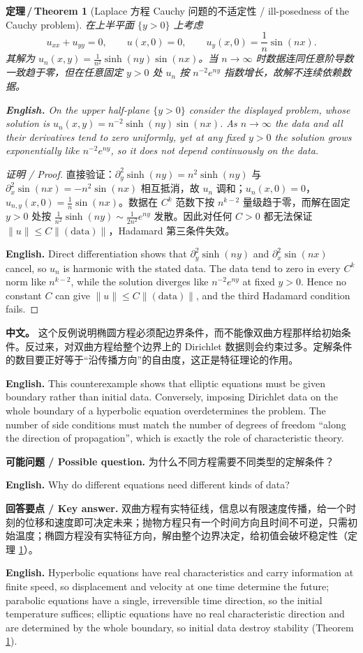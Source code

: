 \documentclass[UTF8,11pt,a4paper]{ctexart}
\newcommand{\APS}[2]{\par\noindent\textbf{中文。} #1\par\noindent\textbf{English.} #2\par\smallskip}
\newcommand{\EN}[1]{\par\noindent \textbf{English.} #1\par}
\newcommand{\ASK}[4]{\par\noindent \textbf{可能问题 / Possible question.} #1\par\EN{#2}\noindent \textbf{回答要点 / Key answer.} #3\par\EN{#4}\medskip}
\newtheorem{theorem}[definition]{定理\,/\,Theorem}
\begin{document}
\begin{theorem}[Laplace 方程 Cauchy 问题的不适定性 / ill-posedness of the Cauchy problem]\label{thm:illposed}
在上半平面 $\{y>0\}$ 上考虑
\[
u_{xx}+u_{yy}=0,\qquad u(x,0)=0,\qquad u_y(x,0)=\frac1n\sin(nx).
\]
其解为 $u_n(x,y)=\frac{1}{n^2}\sinh(ny)\sin(nx)$。当 $n\to\infty$ 时数据连同任意阶导数一致趋于零，但在任意固定 $y>0$ 处 $u_n$ 按 $n^{-2}e^{ny}$ 指数增长，故解不连续依赖数据。
\EN{On the upper half-plane $\{y>0\}$ consider the displayed problem, whose solution is $u_n(x,y)=n^{-2}\sinh(ny)\sin(nx)$. As $n\to\infty$ the data and all their derivatives tend to zero uniformly, yet at any fixed $y>0$ the solution grows exponentially like $n^{-2}e^{ny}$, so it does not depend continuously on the data.}
\end{theorem}

\begin{proof}[证明 / Proof]
直接验证：$\partial_y^2\sinh(ny)=n^2\sinh(ny)$ 与 $\partial_x^2\sin(nx)=-n^2\sin(nx)$ 相互抵消，故 $u_n$ 调和；$u_n(x,0)=0$，$u_{n,y}(x,0)=\frac1n\sin(nx)$。数据在 $C^k$ 范数下按 $n^{k-2}$ 量级趋于零，而解在固定 $y>0$ 处按 $\frac1{n^2}\sinh(ny)\sim\frac{1}{2n^2}e^{ny}$ 发散。因此对任何 $C>0$ 都无法保证 $\|u\|\le C\|(\text{data})\|$，Hadamard 第三条件失效。\EN{Direct differentiation shows that $\partial_y^2\sinh(ny)$ and $\partial_x^2\sin(nx)$ cancel, so $u_n$ is harmonic with the stated data. The data tend to zero in every $C^k$ norm like $n^{k-2}$, while the solution diverges like $n^{-2}e^{ny}$ at fixed $y>0$. Hence no constant $C$ can give $\|u\|\le C\|(\text{data})\|$, and the third Hadamard condition fails.}
\end{proof}

\APS{这个反例说明椭圆方程必须配边界条件，而不能像双曲方程那样给初始条件。反过来，对双曲方程给整个边界上的 Dirichlet 数据则会约束过多。定解条件的数目要正好等于``沿传播方向''的自由度，这正是特征理论的作用。}{This counterexample shows that elliptic equations must be given boundary rather than initial data. Conversely, imposing Dirichlet data on the whole boundary of a hyperbolic equation overdetermines the problem. The number of side conditions must match the number of degrees of freedom ``along the direction of propagation'', which is exactly the role of characteristic theory.}

\ASK{为什么不同方程需要不同类型的定解条件？}{Why do different equations need different kinds of data?}{双曲方程有实特征线，信息以有限速度传播，给一个时刻的位移和速度即可决定未来；抛物方程只有一个时间方向且时间不可逆，只需初始温度；椭圆方程没有实特征方向，解由整个边界决定，给初值会破坏稳定性（定理 \ref{thm:illposed}）。}{Hyperbolic equations have real characteristics and carry information at finite speed, so displacement and velocity at one time determine the future; parabolic equations have a single, irreversible time direction, so the initial temperature suffices; elliptic equations have no real characteristic direction and are determined by the whole boundary, so initial data destroy stability (Theorem \ref{thm:illposed}).}
\end{document}
